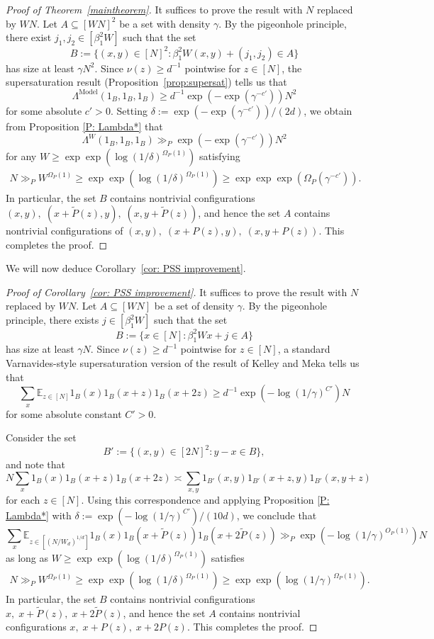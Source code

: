 \documentclass[11pt]{amsart}
\theoremstyle{definition}
\begin{document}
\begin{proof}[Proof of Theorem~\ref{maintheorem}]
It suffices to prove the result with $N$ replaced by $WN$.
Let $A \subseteq [WN]^2$ be a set with density $\gamma$. By the pigeonhole principle, there exist $j_1, j_2 \in [\beta_1^2W]$ such that the set $$B := \{(x,y)\in[N]^2: \beta_1^2W(x,y) + (j_1, j_2) \in A\}$$ has size at least $\gamma N^2$. Since $ \nu(z) \geq d^{-1}$ pointwise for $z \in [N]$, the supersaturation result (Proposition~\ref{prop:supersat}) tells us that 
$$\Lambda^{\mathrm{Model}}(1_B,1_B,1_B) \geq d^{-1}\exp(- \exp (\gamma^{-c'}))N^2$$
for some absolute $c'>0$. Setting $\delta:=\exp(- \exp (\gamma^{-c'}))/(2d)$,
we obtain from Proposition \ref{P: Lambda*} that
$$\Lambda^W(1_B,1_B,1_B) \gg_P \exp(- \exp (\gamma^{-c'})) N^2$$
for any $W\geq \exp\exp(\log(1/\delta)^{\Omega_P(1)})$ satisfying
\begin{align*}
    N\gg_P W^{\Omega_P(1)}\geq \exp\exp(\log(1/\delta)^{\Omega_P(1)})\geq \exp\exp\exp(\Omega_P(\gamma^{-c'})).
\end{align*} 
In particular, the set $B$ contains nontrivial configurations $(x,y),\; (x+\widetilde P(z),y),\; (x,y+\widetilde P(z))$, and hence the set $A$ contains nontrivial configurations of $(x, y),\; (x + P(z), y),\; (x, y + P(z))$.  This completes the proof.
\end{proof}
We will now deduce Corollary~\ref{cor: PSS improvement}.
\begin{proof}[Proof of Corollary~\ref{cor: PSS improvement}]
It suffices to prove the result with $N$ replaced by $WN$.
Let $A \subseteq [WN]$ be a set of density $\gamma$. By the pigeonhole principle, there exists $j \in [\beta_1^2W]$ such that the set $$B := \{x\in[N]: \beta_1^2Wx + j \in A\}$$ has size at least $\gamma N$. Since $\nu(z) \geq d^{-1}$ pointwise for $z \in [N]$, a standard Varnavides-style supersaturation version of the result of Kelley and Meka \cite{KM23} tells us that 
$$\sum_{x} \mathbb{E}_{z \in [N]}1_B(x)1_B(x + z)1_B(x + 2z)  \geq d^{-1}\exp(-\log(1/\gamma)^{C'})N$$
for some absolute constant $C'>0$.

Consider the set
$$B':=\{(x,y) \in [2N]^2: y-x \in B\},$$
and note that
$$N\sum_{x} 1_B(x)1_B(x + z)1_B(x + 2z) \asymp \sum_{x,y} 1_{B'}(x,y)1_{B'}(x + z,y)1_{B'}(x,y+z)$$
for each $z \in [N]$.  Using this correspondence and applying Proposition \ref{P: Lambda*} with $\delta:=\exp(- \log(1/\gamma)^{C'})/(10d)$, we conclude that
$$\sum_{x} \mathbb{E}_{z \in [(N/W_d)^{1/d}]} 1_B(x)1_B(x + \widetilde P(z))1_B(x + 2\widetilde P(z)) \gg_P \exp(-\log(1/\gamma)^{O_P(1)}) N$$
as long as $W\geq \exp\exp(\log(1/\delta)^{\Omega_P(1)})$ satisfies
\begin{align*}
    N\gg_P W^{\Omega_P(1)}\geq \exp\exp(\log(1/\delta)^{\Omega_P(1)})\geq \exp\exp(\log(1/\gamma)^{\Omega_P(1)}).
\end{align*}
In particular, the set $B$ contains nontrivial configurations $x,\; x+\widetilde P(z),\; x+2\widetilde P(z)$, and hence the set $A$ contains nontrivial configurations $x,\; x+ P(z),\; x+2 P(z)$.  This completes the proof.
\end{proof}
\end{document}
